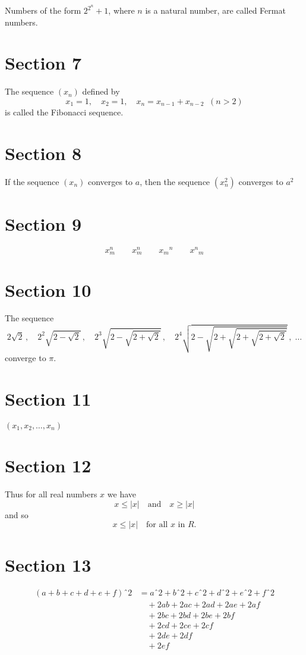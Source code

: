 \documentclass{article}
\begin{document}
Numbers of the form $2^{2^n}+1$, where $n$ is a natural number, are
called Fermat numbers.

\section{ Section   7}

The sequence $(x_n)$ defined by
$$
x_1=1,\quad x_2=1,\quad x_n=x_{n-1}+x_{n-2}\;\;(n>2)
$$
is called the Fibonacci sequence.

\section{ Section   8}
If the sequence $(x_n)$ converges to $a$, then the sequence
$(x_n^2)$ converges to $a^2$

\section{ Section   9}
$$
x_m^n\qquad x^n_m\qquad {x_m}^n\qquad {x^n}_m
$$

\section{ Section   10}
The sequence
$$
2\sqrt{2}\,,
\quad 2^2\sqrt{2-\sqrt{2}}\,,
\quad 2^3\sqrt{2-\sqrt{2+\sqrt{2}}}\,,
\quad 2^4\sqrt{2-\sqrt{2+\sqrt{2+\sqrt{2+\sqrt{2}}}}}\,,
\;\ldots
$$
converge to $\pi$.

\section{ Section   11}
\newcommand{\vect}[1]{(#1_1,#1_2,\dots,#1_n)}
$\vect{x}$

\section{ Section   12}
Thus for all real numbers $x$ we have
\begin{equation*}
    x\le|x|\quad\text{and}\quad x\ge|x|
\end{equation*}
and so
\begin{equation*}
    x\le|x|\quad\text{for all $x$ in $R$}.
\end{equation*}

\section{ Section   13}
\begin{equation*}
\begin{split}
(a+b+c+d+e+f)ˆ2 & = aˆ2+bˆ2+cˆ2+dˆ2+eˆ2+fˆ2\\
    &\quad +2ab+2ac+2ad+2ae+2af\\
    &\quad +2bc+2bd+2be+2bf\\
    &\quad +2cd+2ce+2cf\\
    &\quad +2de+2df\\
    &\quad +2ef
\end{split}
\end{equation*}
\end{document}
